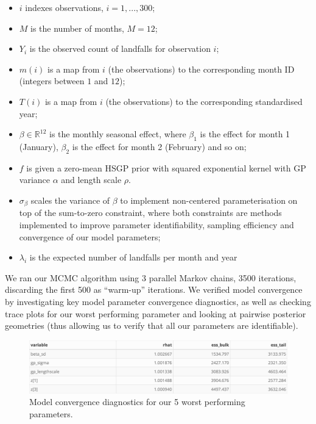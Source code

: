 \documentclass[
]{article}
\providecommand{\tightlist}{%
  \setlength{\itemsep}{0pt}\setlength{\parskip}{0pt}}
\begin{document}
\begin{itemize}
\tightlist
\item
  \(i\) indexes observations, \(i=1,...,300\);
\item
  \(M\) is the number of months, \(M = 12\);
\item
  \(Y_{i}\) is the observed count of landfalls for observation \(i\);
\item
  \(m(i)\) is a map from \(i\) (the observations) to the corresponding month ID (integers between \(1\) and \(12\));
\item
  \(T(i)\) is a map from \(i\) (the observations) to the corresponding standardised year;
\item
  \(\beta \in \mathbb{R}^{12}\) is the monthly seasonal effect, where \(\beta_1\) is the effect for month 1 (January), \(\beta_2\) is the effect for month 2 (February) and so on;
\item
  \(f\) is given a zero-mean HSGP prior with squared exponential kernel with GP variance \(\alpha\) and length scale \(\rho\).\\
\item
  \(\sigma_{\beta}\) scales the variance of \(\beta\) to implement non-centered parameterisation on top of the sum-to-zero constraint, where both constraints are methods implemented to improve parameter identifiability, sampling efficiency and convergence of our model parameters;
\item
  \(\lambda_{i}\) is the expected number of landfalls per month and year
\end{itemize}

We ran our MCMC algorithm using 3 parallel Markov chains, 3500 iterations, discarding the first 500 as ``warm-up'' iterations. We verified model convergence by investigating key model parameter convergence diagnostics, as well as checking trace plots for our worst performing parameter and looking at pairwise posterior geometries (thus allowing us to verify that all our parameters are identifiable).

\begin{figure}

{\centering \includegraphics[width=1\linewidth]{../outputs/bayesian-analysis-monthly-freq/model-HSGP/HSGP-model-diagnostics} 

}

\caption{Model convergence diagnostics for our 5 worst performing parameters.}\label{fig:figs9}
\end{figure}
\end{document}
